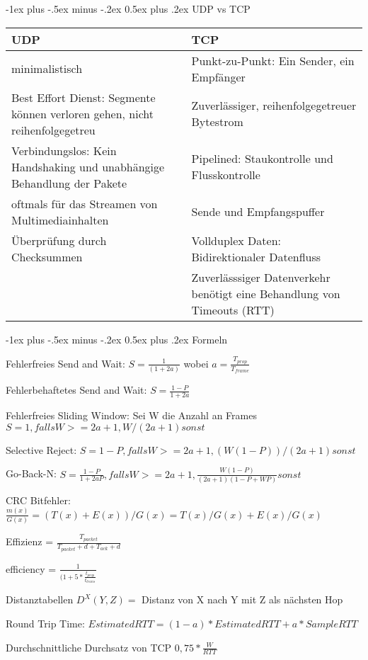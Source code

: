 \documentclass[10pt,landscape]{article}
\makeatletter
\renewcommand{\section}{\@startsection{section}{1}{0mm}%
                                {-1ex plus -.5ex minus -.2ex}%
                                {0.5ex plus .2ex}%
                                {\normalfont\large\bfseries}}
\makeatother
\begin{document}
\section{UDP vs TCP}
\begin{tabular}{l | l}
    UDP & TCP \\ \hline
    minimalistisch & Punkt-zu-Punkt: Ein Sender, ein Empfänger \\
    Best Effort Dienst: Segmente können verloren gehen, nicht reihenfolgegetreu & Zuverlässiger, reihenfolgegetreuer Bytestrom \\
    Verbindungslos: Kein Handshaking und unabhängige Behandlung der Pakete & Pipelined: Staukontrolle und Flusskontrolle \\
    oftmals für das Streamen von Multimediainhalten & Sende und Empfangspuffer \\
    Überprüfung durch Checksummen & Vollduplex Daten: Bidirektionaler Datenfluss \\
    & Zuverlässsiger Datenverkehr benötigt eine Behandlung von Timeouts (RTT) \\
\end{tabular}


\section{Formeln}

Fehlerfreies Send and Wait: $S = \frac{1}{(1+2a)}$ wobei $a = \frac{T_{prop}}{T_{frame}}$

Fehlerbehaftetes Send and Wait: $S = \frac{1-P}{1+2a}$

Fehlerfreies Sliding Window: Sei W die Anzahl an Frames $S = {1, falls W >= 2a+1, W/(2a+1) sonst}$

Selective Reject: $S = {1-P, falls W >= 2a+1, (W(1-P))/(2a+1) sonst}$

Go-Back-N: $S = {\frac{1-P}{1+2aP}, falls W >= 2a+1, \frac{W(1-P)}{(2a+1)(1-P+WP)} sonst}$

CRC Bitfehler: $\frac{m(x)}{G(x)} = (T(x)+E(x)) / G(x) = T(x)/G(x) + E(x)/G(x)$

Effizienz = $\frac{T_{packet} }{ T_{packet} + d + T_{ack} + d}$

efficiency = $\frac{1}{ (1+ 5 * \frac{t_{prop}}{t_{trans}}}$

Distanztabellen $D^X(Y,Z) =$ Distanz von X nach Y mit Z als nächsten Hop

Round Trip Time: $EstimatedRTT = (1-a) * EstimatedRTT + a * SampleRTT$

Durchschnittliche Durchsatz von TCP $ 0,75 * \frac{W}{RTT}$
\end{document}
